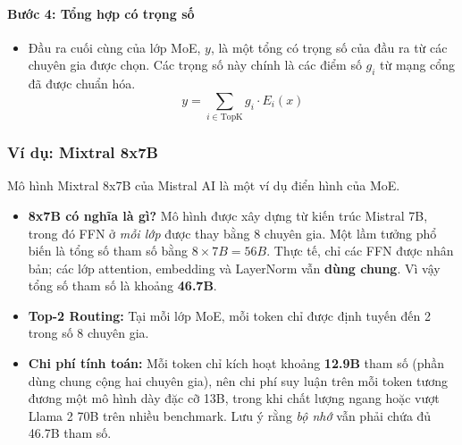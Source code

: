 \paragraph{Bước 4: Tổng hợp có trọng số}
\begin{itemize}
    \item Đầu ra cuối cùng của lớp MoE, $y$, là một tổng có trọng số của đầu ra từ các chuyên gia được chọn. Các trọng số này chính là các điểm số $g_i$ từ mạng cổng đã được chuẩn hóa.
    $$ y = \sum_{i \in \text{TopK}} g_i \cdot E_i(x) $$
\end{itemize}

\subsubsection{Ví dụ: Mixtral 8x7B}
Mô hình Mixtral 8x7B của Mistral AI \cite{jiang2024mixtral} là một ví dụ điển hình của MoE.
\begin{itemize}
    \item \textbf{8x7B có nghĩa là gì?} Mô hình được xây dựng từ kiến trúc Mistral 7B, trong đó FFN ở \emph{mỗi lớp} được thay bằng 8 chuyên gia. Một lầm tưởng phổ biến là tổng số tham số bằng $8 \times 7B = 56B$. Thực tế, chỉ các FFN được nhân bản; các lớp attention, embedding và LayerNorm vẫn \textbf{dùng chung}. Vì vậy tổng số tham số là khoảng \textbf{46.7B}.
    \item \textbf{Top-2 Routing:} Tại mỗi lớp MoE, mỗi token chỉ được định tuyến đến 2 trong số 8 chuyên gia.
    \item \textbf{Chi phí tính toán:} Mỗi token chỉ kích hoạt khoảng \textbf{12.9B} tham số (phần dùng chung cộng hai chuyên gia), nên chi phí suy luận trên mỗi token tương đương một mô hình dày đặc cỡ 13B, trong khi chất lượng ngang hoặc vượt Llama 2 70B trên nhiều benchmark. Lưu ý rằng \emph{bộ nhớ} vẫn phải chứa đủ 46.7B tham số.
\end{itemize}
